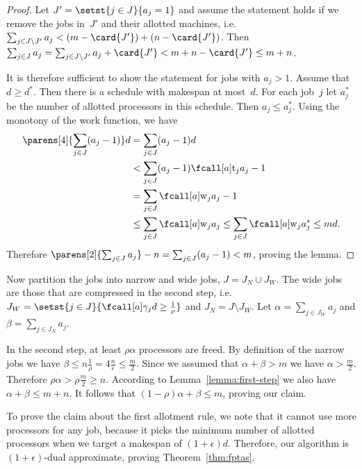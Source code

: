 \begin{proof}
  Let $J' = \setst{j \in J}{a_j = 1}$ and assume the statement holds
  if we remove the jobs in~$J'$ and their allotted machines,
  i.e.~$\sum_{j \in J \setminus J'} a_j < (m-\card{J'}) + (n-\card{J'})$.
  Then $\sum_{j \in J} a_j = \sum_{j \in J \setminus J'} a_j + \card{J'}
  < m + n - \card{J'} \leq m + n$.
  
  It is therefore sufficient to show the statement for jobs with $a_j > 1$.
  Assume that $d \geq d^*$.
  Then there is a schedule with makespan at most~$d$.
  For each job~$j$ let $a_j^*$ be the number of allotted processors in this schedule.
  Then $a_j \leq a_j^*$.
  Using the monotony of the work function, we have
  \begin{equation}
    \begin{aligned}
      \parens[4]{\sum_{j \in J} (a_j - 1)} d &= \sum_{j \in J} (a_j - 1)d  \\
      &< \sum_{j \in J} (a_j - 1) \ptm{j}{a_j -1} \\
      &= \sum_{j \in J} \work{j}{a_j - 1} \\
      &\leq \sum_{j \in J} \work{j}{a_j} 
       \leq \sum_{j \in J} \work{j}{a_j^*}
       \leq m d \dpunct{.}
    \end{aligned}
  \end{equation}
  Therefore $\parens[2]{\sum_{j \in J} a_j} - n = \sum_{j \in J} (a_j - 1) < m$,
  proving the lemma.
\end{proof}

Now partition the jobs into narrow and wide jobs, $J = J_N \cup J_W$.
The wide jobs are those that are compressed in the second step,
i.e.~$J_W = \setst{j \in J}{\procnum{j}{d} \geq \frac{1}{\rho}}$ and $J_N = J \setminus J_W$.
Let $\alpha = \sum_{j \in J_W} a_j$ and $\beta = \sum_{j \in J_N} a_j$.

In the second step, at least $\rho \alpha$ processors are freed.
By definition of the narrow jobs we have $\beta \leq n \frac{1}{\rho} = 4\frac{n}{\epsilon} \leq \frac{m}{2}$.
Since we assumed that $\alpha + \beta > m$ we have $\alpha > \frac{m}{2}$.
Therefore $\rho \alpha > \rho \frac{m}{2} \geq n$.
According to Lemma~\ref{lemma:first-step} we also have $\alpha + \beta \leq m + n$.
It follows that $(1-\rho)\alpha + \beta \leq m$, proving our claim.

To prove the claim about the first allotment rule,
we note that it cannot use more processors for any job, because it picks the minimum number of allotted processors when we target a makespan of $(1+\epsilon)d$.
Therefore, our algorithm is $(1+\epsilon)$-dual approximate,
proving Theorem~\ref{thm:fptas}.


